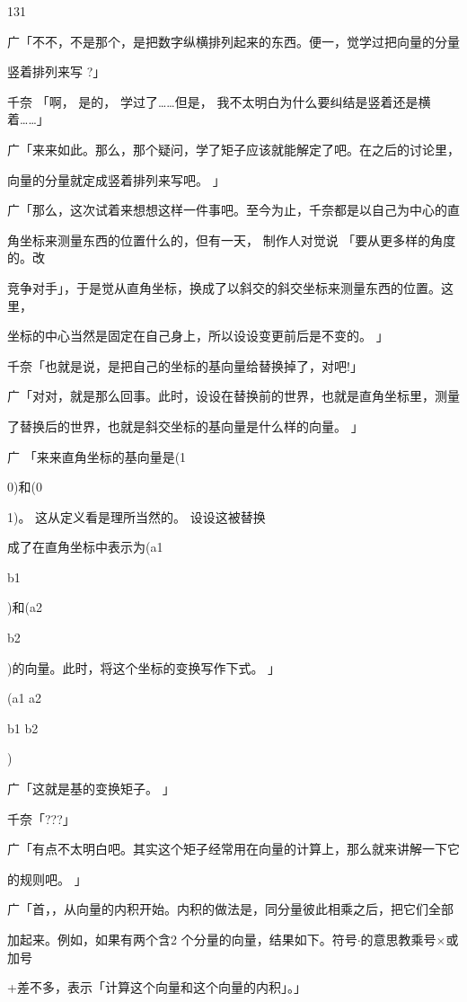 131\par
广「不不，不是那个，是把数字纵横排列起来的东西。便一，觉学过把向量的分量\par
竖着排列来写 ?」\par
千奈 「啊， 是的， 学过了……但是， 我不太明白为什么要纠结是竖着还是横着……」\par
广「来来如此。那么，那个疑问，学了矩子应该就能解定了吧。在之后的讨论里，\par
向量的分量就定成竖着排列来写吧。 」\par
广「那么，这次试着来想想这样一件事吧。至今为止，千奈都是以自己为中心的直\par
角坐标来测量东西的位置什么的，但有一天， 制作人对觉说 「要从更多样的角度的。改\par
竞争对手」，于是觉从直角坐标，换成了以斜交的斜交坐标来测量东西的位置。这里，\par
坐标的中心当然是固定在自己身上，所以设设变更前后是不变的。 」\par
千奈「也就是说，是把自己的坐标的基向量给替换掉了，对吧!」\par
广「对对，就是那么回事。此时，设设在替换前的世界，也就是直角坐标里，测量\par
了替换后的世界，也就是斜交坐标的基向量是什么样的向量。 」\par
广 「来来直角坐标的基向量是(1\par
0)和(0\par
1)。 这从定义看是理所当然的。 设设这被替换\par
成了在直角坐标中表示为(a1\par
b1\par
)和(a2\par
b2\par
)的向量。此时，将这个坐标的变换写作下式。 」\par
(a1 a2\par
b1 b2\par
)\par
广「这就是基的变换矩子。 」\par
千奈「???」\par
广「有点不太明白吧。其实这个矩子经常用在向量的计算上，那么就来讲解一下它\par
的规则吧。 」\par
广「首，，从向量的内积开始。内积的做法是，同分量彼此相乘之后，把它们全部\par
加起来。例如，如果有两个含2 个分量的向量，结果如下。符号$\cdot$的意思教乘号$\times$或加号\par
+差不多，表示「计算这个向量和这个向量的内积」。」\par
